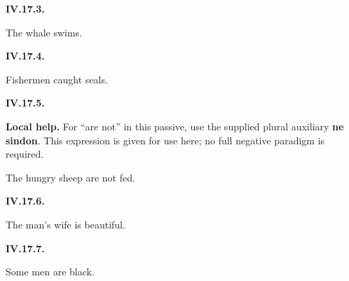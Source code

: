 \par\begin{minipage}{\linewidth}\raggedright
\textbf{IV.17.3.}

The whale swims.

\end{minipage}\par\addvspace{4pt}

\par\begin{minipage}{\linewidth}\raggedright
\textbf{IV.17.4.}

Fishermen caught seals.

\end{minipage}\par\addvspace{4pt}

\par\begin{minipage}{\linewidth}\raggedright
\textbf{IV.17.5.}

\textbf{Local help.} For “are not” in this passive, use the supplied plural auxiliary \textbf{ne sindon}. This expression is given for use here; no full negative paradigm is required.

The hungry sheep are not fed.

\end{minipage}\par\addvspace{4pt}

\par\begin{minipage}{\linewidth}\raggedright
\textbf{IV.17.6.}

The man’s wife is beautiful.

\end{minipage}\par\addvspace{4pt}

\par\begin{minipage}{\linewidth}\raggedright
\textbf{IV.17.7.}

Some men are black.

\end{minipage}\par\addvspace{4pt}

